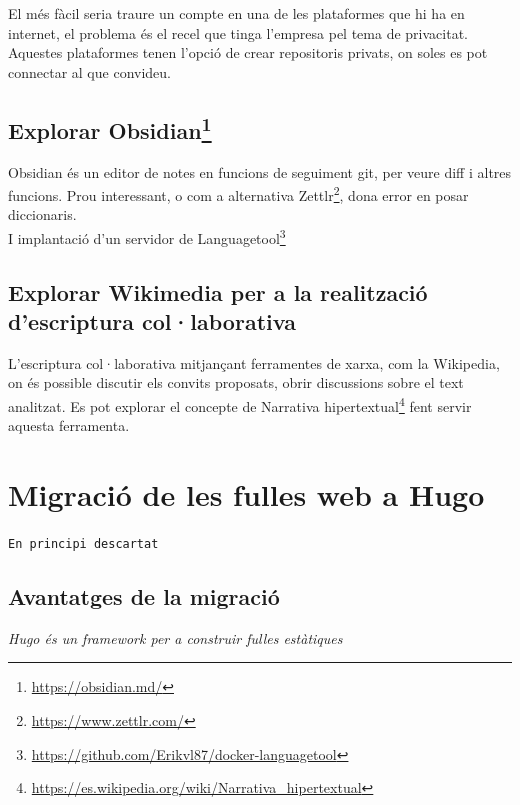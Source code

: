 \documentclass[
  10pt,
]{krantz}
\DeclareRobustCommand{\href}[2]{#2\footnote{\url{#1}}}
\begin{document}
El més fàcil seria traure un compte en una de les plataformes que hi ha en internet, el problema és el recel que tinga l'empresa pel tema de privacitat. Aquestes plataformes tenen l'opció de crear repositoris privats, on soles es pot connectar al que convideu.

\hypertarget{explorar-obsidian}{%
\section{\texorpdfstring{Explorar \href{https://obsidian.md/}{Obsidian}}{Explorar Obsidian}}\label{explorar-obsidian}}

Obsidian és un editor de notes en funcions de seguiment git, per veure diff i altres funcions. Prou interessant, o com a alternativa \href{https://www.zettlr.com/}{Zettlr}, dona error en posar diccionaris.\\
I implantació d'un servidor de \href{https://github.com/Erikvl87/docker-languagetool}{Languagetool}

\hypertarget{explorar-wikimedia-per-a-la-realitzaciuxf3-descriptura-collaborativa}{%
\section{Explorar Wikimedia per a la realització d'escriptura col·laborativa}\label{explorar-wikimedia-per-a-la-realitzaciuxf3-descriptura-collaborativa}}

L'escriptura col·laborativa mitjançant ferramentes de xarxa, com la Wikipedia, on és possible discutir els convits proposats, obrir discussions sobre el text analitzat. Es pot explorar el concepte de \href{https://es.wikipedia.org/wiki/Narrativa_hipertextual}{Narrativa hipertextual} fent servir aquesta ferramenta.

\hypertarget{migraciuxf3-de-les-fulles-web-a-hugo}{%
\chapter{Migració de les fulles web a Hugo}\label{migraciuxf3-de-les-fulles-web-a-hugo}}

\texttt{En\ principi\ descartat}

\hypertarget{avantatges-de-la-migraciuxf3}{%
\section{Avantatges de la migració}\label{avantatges-de-la-migraciuxf3}}

\emph{Hugo és un framework per a construir fulles estàtiques}
\end{document}
